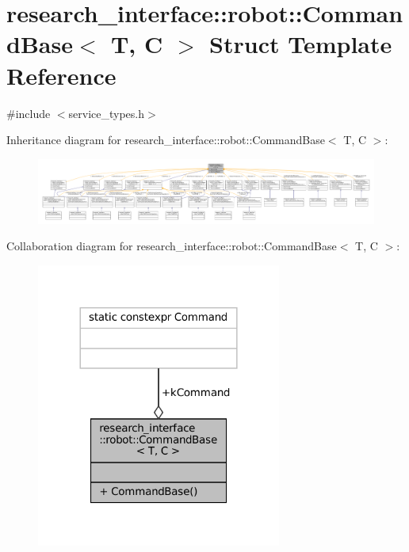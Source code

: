 \hypertarget{structresearch__interface_1_1robot_1_1CommandBase}{}\section{research\+\_\+interface\+:\+:robot\+:\+:Command\+Base$<$ T, C $>$ Struct Template Reference}
\label{structresearch__interface_1_1robot_1_1CommandBase}


{\ttfamily \#include $<$service\+\_\+types.\+h$>$}



Inheritance diagram for research\+\_\+interface\+:\+:robot\+:\+:Command\+Base$<$ T, C $>$\+:
\nopagebreak
\begin{figure}[H]
\begin{center}
\leavevmode
\includegraphics[width=350pt]{structresearch__interface_1_1robot_1_1CommandBase__inherit__graph}
\end{center}
\end{figure}


Collaboration diagram for research\+\_\+interface\+:\+:robot\+:\+:Command\+Base$<$ T, C $>$\+:
\nopagebreak
\begin{figure}[H]
\begin{center}
\leavevmode
\includegraphics[width=228pt]{structresearch__interface_1_1robot_1_1CommandBase__coll__graph}
\end{center}
\end{figure}
